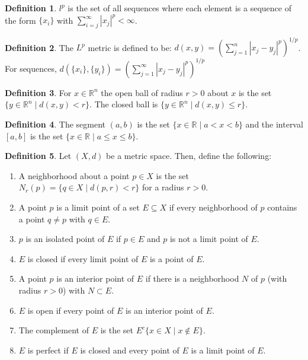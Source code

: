 \documentclass[12pt]{article}
\theoremstyle{definition}
\newtheorem{definition}{Definition}
\theoremstyle{named}
\begin{document}
\renewcommand{\thedefinition}{6.1}
\begin{definition}
    $l^p$ is the set of all sequences where each element is a sequence of the form $\{x_i\}$ with $\sum_{i=j}^{\infty} |x_j|^p < \infty$.
\end{definition}

\renewcommand{\thedefinition}{6.1}
\begin{definition}
    The $L^p$ metric is defined to be: $d(x,y) = \left(\sum_{j=1}^{n} |x_j - y_j|^p \right)^{1/p}$. For sequences, $d\left(\{x_i\}, \{y_i\}\right) = \left(\sum_{j=1}^{\infty} |x_j - y_j|^p \right)^{1/p}$
\end{definition}

\renewcommand{\thedefinition}{6.1}
\begin{definition}
    For $x \in \mathbb{R}^n$ the open ball of radius $r>0$ about $x$ is the set $\{y \in \mathbb{R}^n \mid d(x,y) < r\}$. The closed ball is $\{y \in \mathbb{R}^n \mid d(x,y) \leq r\}$. 
\end{definition}

\renewcommand{\thedefinition}{6.1}
\begin{definition}
    The segment $(a,b)$ is the set $\{x \in \mathbb{R} \mid a < x < b\}$ and the interval $[a,b]$ is the set $\{x \in \mathbb{R} \mid a \leq x \leq b\}$. 
\end{definition}

\renewcommand{\thedefinition}{6.1}
\begin{definition}
    Let $(X,d)$ be a metric space. Then, define the following: 
    \begin{enumerate}
        \item A neighborhood about a point $p \in X$ is the set $N_r(p) = \{q \in X \mid d(p,r) < r\}$ for a radius $r>0$.
        \item A point $p$ is a limit point of a set $E \subseteq X$ if every neighborhood of $p$ contains a point $q \neq p$ with $q \in E$. 
        \item $p$ is an isolated point of $E$ if $p \in E$ and $p$ is not a limit point of $E$. 
        \item $E$ is closed if every limit point of $E$ is a point of $E$. 
        \item A point $p$ is an interior point of $E$ if there is a neighborhood $N$ of $p$ (with radius $r>0$) with $N \subset E$. 
        \item $E$ is open if every point of $E$ is an interior point of $E$. 
        \item The complement of $E$ is the set $E^c \{x \in X \mid x \notin E\}$. 
        \item $E$ is perfect if $E$ is closed and every point of $E$ is a limit point of $E$.  
    \end{enumerate}
\end{definition}
\end{document}
